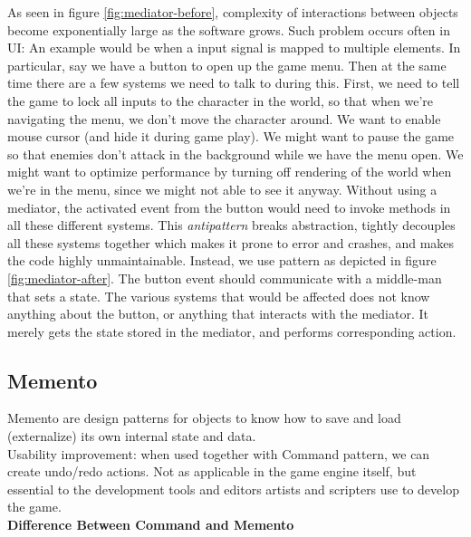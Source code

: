 \begin{multicols}{2}
As seen in figure \ref{fig:mediator-before}, complexity of interactions between objects become exponentially large as the software grows.
\bs
Such problem occurs often in UI: An example would be when a input signal is mapped to multiple elements. In particular, say we have a button to open up the game menu. Then at the same time there are a few systems we need to talk to during this. First, we need to tell the game to lock all inputs to the character in the world, so that when we're navigating the menu, we don't move the character around. We want to enable mouse cursor (and hide it during game play). We might want to pause the game so that enemies don't attack in the background while we have the menu open. We might want to optimize performance by turning off rendering of the world when we're in the menu, since we might not able to see it anyway.
\bs
Without using a mediator, the activated event from the button would need to invoke methods in all these different systems. This \textit{antipattern} breaks abstraction, tightly decouples all these systems together which makes it prone to error and crashes, and makes the code highly unmaintainable.
\bs
Instead, we use pattern as depicted in figure \ref{fig:mediator-after}. The button event should communicate with a middle-man that sets a state. The various systems that would be affected does not know anything about the button, or anything that interacts with the mediator. It merely gets the state stored in the mediator, and performs corresponding action.
\bs


\subsection{Memento}

Memento are design patterns for objects to know how to save and load (externalize) its own internal state and data.\bs
\\
Usability improvement: when used together with Command pattern, we can create undo/redo actions. Not as applicable in the game engine itself, but essential to the development tools and editors artists and scripters use to develop the game.\bs
\\

\textbf{Difference Between Command and Memento}\bs
\\


\end{multicols}
